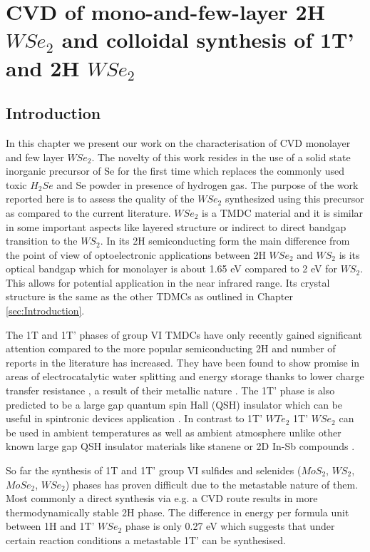 \chapter{CVD of mono-and-few-layer 2H $WSe_2$ and colloidal synthesis of 1T' and 2H $WSe_2$}

\section{Introduction}
	
In this chapter we present our work on the characterisation of CVD monolayer and few layer $WSe_2$. The novelty of this work resides in the use of a solid state inorganic precursor of Se for the first time which replaces the commonly used toxic $H_2Se$ and Se powder in presence of hydrogen gas. The purpose of the work reported here is to assess the quality of the $WSe_2$ synthesized using this precursor as compared to the current literature. $WSe_2$ is a TMDC material and it is similar in some important aspects like layered structure or indirect to direct bandgap transition to the $WS_2$. In its 2H semiconducting form the main difference from the point of view of optoelectronic applications between 2H $WSe_2$ and $WS_2$ is its optical bandgap which for monolayer is about 1.65 eV compared to 2 eV for $WS_2$. This allows for potential application in the near infrared range. Its crystal structure is the same as the other TDMCs as outlined in Chapter \ref{sec:Introduction}.

The 1T and 1T' phases of group VI TMDCs have only recently gained significant attention compared to the more popular semiconducting 2H and number of reports in the literature has increased. They have been found to show promise in areas of electrocatalytic water splitting and energy storage thanks to lower charge transfer resistance \cite{Voiry2013}, a result of their metallic nature \cite{Wypych1992}. The 1T' phase is also predicted to be a large gap quantum spin Hall (QSH) insulator which can be useful in spintronic devices  application \cite{Chen2018}. In contrast to 1T' $WTe_2$ \cite{Fei2017} 1T' $WSe_2$ can be used in ambient temperatures as well as ambient atmosphere unlike other known large gap QSH insulator materials like stanene \cite{Xu2013} or 2D In-Sb compounds \cite{Gruznev2018}. 

So far the synthesis of 1T and 1T' group VI sulfides and selenides ($MoS_2$, $WS_2$, $MoSe_2$, $WSe_2$)  phases has proven difficult due to the metastable nature of them. Most commonly a direct synthesis via e.g. a CVD route results in more thermodynamically stable 2H phase. The difference in energy per formula unit between 1H and 1T' $WSe_2$ phase is only 0.27 eV which suggests that under certain reaction conditions a metastable 1T' can be synthesised.

